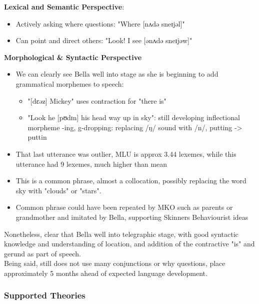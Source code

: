 \documentclass[
]{article}
\providecommand{\tightlist}{%
  \setlength{\itemsep}{0pt}\setlength{\parskip}{0pt}}
\begin{document}
\textbf{Lexical and Semantic Perspective}:

\begin{itemize}
\tightlist
\item
  Actively asking where questions: "Where {[}nʌdə sneɪjəl{]}"
\item
  Can point and direct others: "Look! I see {[}ənʌdə sneɪjəw{]}"
\end{itemize}

\textbf{Morphological \& Syntactic Perspective}

\begin{itemize}
\item
  We can clearly see Bella well into stage as she is beginning to add
  grammatical morphemes to speech:

  \begin{itemize}
  \tightlist
  \item
    "{[}dɛəz{]} Mickey" uses contraction for "there is"
  \item
    "Look he {[}pʊdɪn{]} his head way up in sky": still developing
    inflectional morpheme -ing, g-dropping: replacing /ŋ/ sound with
    /n/, putting -\textgreater{} puttin\textquotesingle{}
  \end{itemize}
\item
  That last utterance was outlier, MLU is approx 3.44 lexemes, while
  this utterance had 9 lexemes, much higher than mean
\item
  This is a common phrase, almost a collocation, possibly replacing the
  word sky with "clouds" or "stars".
\item
  Common phrase could have been repeated by MKO such as parents or
  grandmother and imitated by Bella, supporting
  Skinner\textquotesingle s Behaviourist ideas
\end{itemize}

Nonetheless, clear that Bella well into telegraphic stage, with good
syntactic knowledge and understanding of location, and addition of the
contractive "is" and gerund as part of speech.\\
Being said, still does not use many conjunctions or why questions, place
approximately 5 months ahead of expected language development.

\hypertarget{supported-theories}{%
\subsubsection{Supported Theories}\label{supported-theories}}
\end{document}
